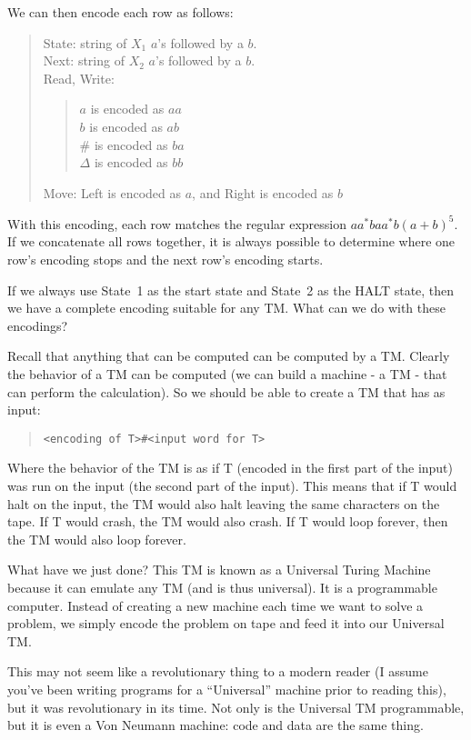 \documentclass[letterpaper,12pt,openany,reqno]{book}%
\begin{document}
We can then encode each row as follows:
\begin{quote}
State: string of $X_1$ $a$'s followed by a $b$.\\
Next: string of $X_2$ $a$'s followed by a $b$.\\
Read, Write: 
\begin{quote}
$a$ is encoded as $aa$\\
$b$ is encoded as $ab$\\
\# is encoded as $ba$\\
$\Delta$ is encoded as $bb$
\end{quote}
Move: Left is encoded as $a$, and Right is encoded as $b$
\end{quote}
With this encoding, each row matches the regular expression $aa^*baa^*b(a+b)^5$. If we concatenate all rows together, it is always possible to determine where one row's encoding stops and the next row's encoding starts.

If we always use State~1 as the start state and State~2 as the HALT state, then we have a complete encoding suitable for any TM. What can we do with these encodings?

Recall that anything that can be computed can be computed by a TM. Clearly the behavior of a TM can be computed (we can build a machine - a TM - that can perform the calculation). So we should be able to create a TM that has as input:
\begin{quote}
\verb;<encoding of T>#<input word for T>;
\end{quote}
Where the behavior of the TM is as if T (encoded in the first part of the input) was run on the input (the second part of the input). This means that if T would halt on the input, the TM would also halt leaving the same characters on the tape. If T would crash, the TM would also crash. If T would loop forever, then the TM would also loop forever.

What have we just done? This TM is known as a Universal Turing Machine because it can emulate any TM (and is thus universal). It is a programmable computer. Instead of creating a new machine each time we want to solve a problem, we simply encode the problem on tape and feed it into our Universal TM.

This may not seem like a revolutionary thing to a modern reader (I assume you've been writing programs for a ``Universal'' machine prior to reading this), but it was revolutionary in its time. Not only is the Universal TM programmable, but it is even a Von Neumann machine: code and data are the same thing. 
\end{document}
